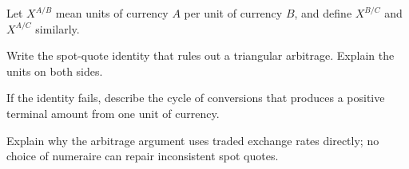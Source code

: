\begin{exercise}
Let \(X^{A/B}\) mean units of currency \(A\) per unit of currency \(B\), and
define \(X^{B/C}\) and \(X^{A/C}\) similarly.
\begin{exparts}
  \item Write the spot-quote identity that rules out a triangular arbitrage.
  Explain the units on both sides.
  \item If the identity fails, describe the cycle of conversions that
  produces a positive terminal amount from one unit of currency.
  \item Explain why the arbitrage argument uses traded exchange rates
  directly; no choice of numeraire can repair inconsistent spot quotes.
\end{exparts}
\end{exercise}
\fi
